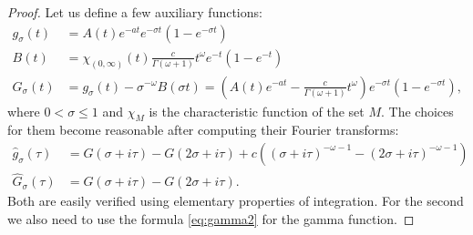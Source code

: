 \begin{proof}
Let us define a few auxiliary functions:
\begin{align*}
    g_\sigma(t) &= A(t)e^{-a t}e^{-\sigma t}(1-e^{- \sigma t}) \\
    B(t) &= \chi_{(0,\infty)}(t) \frac{c}{\Gamma(\omega + 1)} t^\omega e^{-t} (1-e^{-t}) \\
    G_\sigma(t) &= g_\sigma(t) - \sigma^{-\omega} B(\sigma t) 
    = \left( A(t)e^{-a t} - \frac{c}{\Gamma(\omega + 1)} t^\omega \right) e^{-\sigma t}(1-e^{- \sigma t}), 
\end{align*}
where $0 < \sigma \leq 1$ and $\chi_M$ is the characteristic function of the set $M$.
The choices for them become reasonable after computing their Fourier transforms:
\begin{align*}
    \hat{g}_\sigma(\tau) &= G(\sigma + i\tau) - G(2\sigma + i\tau) + c ( (\sigma + i\tau)^{-\omega-1} - (2\sigma + i\tau)^{-\omega - 1}) \\
    \hat{G}_\sigma(\tau) &= G(\sigma + i\tau) - G(2\sigma + i\tau).
\end{align*}
Both are easily verified using elementary properties of integration. For the second we also need to use the formula \eqref{eq:gamma2} for the gamma function.


\end{proof}
